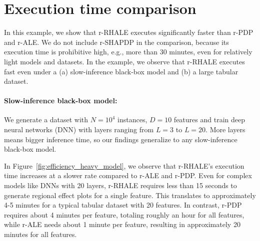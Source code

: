 \documentclass[
twocolumn,
]{ceurart}
\begin{document}


\section{Execution time comparison}
\label{sec:efficiency}


In this example, we show that r-RHALE executes significantly faster than r-PDP and r-ALE.
We do not include r-SHAPDP in the comparison, because its execution time is prohibitive high, e.g., more than 30 minutes, even for relatively light models and datasets. In the example, we observe that r-RHALE executes fast even under a (a) slow-inference black-box model and (b) a large tabular dataset.

\paragraph{Slow-inference black-box model:}

We generate a dataset with $N=10^4$ instances, $D=10$ features and train deep neural networks (DNN) with layers ranging from $L=3$ to $L=20$. More layers means bigger inference time, so our findings generalize to any slow-inference black-box model.

In Figure~\ref{fig:efficiency_heavy_model}, we observe that r-RHALE's execution time increases at a slower rate compared to r-ALE and r-PDP. Even for complex models like DNNs with 20 layers, r-RHALE requires less than 15 seconds to generate regional effect plots for a single feature. This translates to approximately 4-5 minutes for a typical tabular dataset with 20 features. In contrast, r-PDP requires about 4 minutes per feature, totaling roughly an hour for all features, while r-ALE needs about 1 minute per feature, resulting in approximately 20 minutes for all features.
\end{document}
